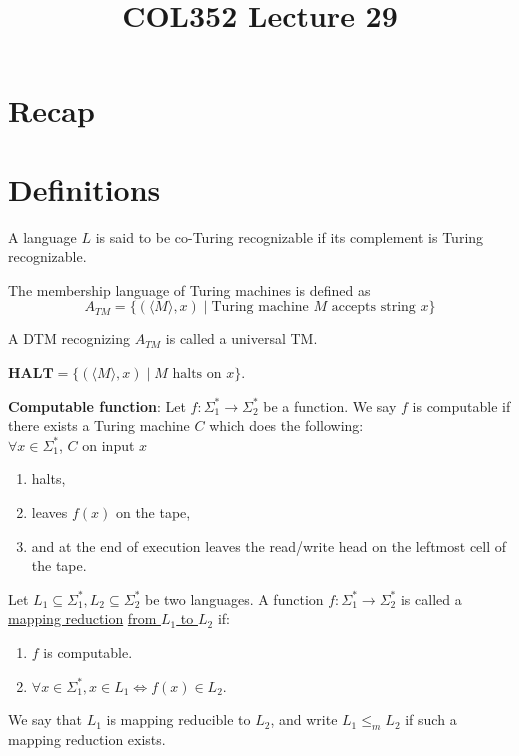 \documentclass[a4paper]{article}
\title{\textbf{COL352 Lecture 29}}
\date{}
\newcommand{\nl}{\vspace{0.2cm}\\}
\newcommand{\mf}{\mathbf}
\begin{document}
\maketitle
\tableofcontents

\section{Recap}

\section{Definitions}

\begin{defn}
    A language $L$ is said to be co-Turing recognizable if its complement is Turing recognizable.
\end{defn}

\begin{defn}
    The membership language of Turing machines is defined as
    \[
        A_{TM} = \{(\langle M \rangle, x) \mid \text{Turing machine } M \text{ accepts string }x\}
    \]
\end{defn}

\begin{defn}
    A DTM recognizing $A_{TM}$ is called a universal TM.
\end{defn}

\begin{defn}
    $\mf{HALT} = \{(\langle M \rangle, x) \mid M \text{ halts on } x\}$.
\end{defn}

\begin{defn}
    \textbf{Computable function}: Let $f : \Sigma_1^* \to \Sigma_2^*$ be a function. We say $f$ is computable if there exists a Turing machine $C$ which does the following:\nl
    $\forall x \in \Sigma_1^*$, $C$ on input $x$
    \begin{enumerate}
        \item halts,
        \item leaves $f(x)$ on the tape,
        \item and at the end of execution leaves the read/write head on the leftmost cell of the tape.
    \end{enumerate}
\end{defn}

\begin{defn}
    Let $L_1 \subseteq \Sigma_1^*, L_2 \subseteq \Sigma_2^*$ be two languages. A function $f : \Sigma_1^* \to \Sigma_2^*$ is called a \underline{mapping reduction} \underline{from $L_1$ to $L_2$}
    if:
    \begin{enumerate}
        \item $f$ is computable.
        \item $\forall x \in \Sigma_1^*, x \in L_1 \iff f(x) \in L_2$.
    \end{enumerate}
    We say that $L_1$ is mapping reducible to $L_2$, and write $L_1 \le_m L_2$ if such a mapping reduction exists.
\end{defn}
\end{document}
